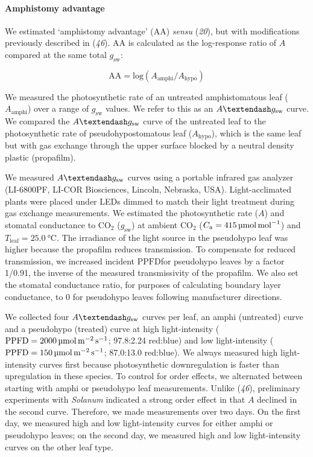 \documentclass[
  letterpaper,
  DIV=11,
  numbers=noendperiod]{scrartcl}
\let\oldparagraph\paragraph
\renewcommand{\paragraph}[1]{\oldparagraph{#1}\mbox{}}
\newcommand{\aax}{$\mathrm{AA}$}
\newcommand{\Aamphi}{$A_{\mathrm{amphi}}$}
\newcommand{\Ahypo}{$A_{\mathrm{hypo}}$}
\newcommand{\agcurve}{$A \textendash g_\text{sw}$}
\newcommand{\caequals}[1]{$C_\mathrm{a} = \qty{#1}{\micro\mol\raiseto{-1}\mol}$}
\newcommand{\gsw}{$g_\text{sw}$}
\newcommand{\ppfd}{$\mathrm{PPFD}$}
\newcommand{\ppfdequals}[1]{$\mathrm{PPFD} = \qty{#1}{\micro\mol\raiseto{-2}\meter\raiseto{-1}\second}$}
\newcommand{\tleafequals}[1]{$T_\mathrm{leaf} = \qty{#1}{\degreeCelsius}$}
\begin{document}
\paragraph{Amphistomy advantage}\label{amphistomy-advantage}

We estimated `amphistomy advantage' (\aax) \emph{sensu} (\emph{20}), but
with modifications previously described in (\emph{46}). \aax{} is
calculated as the log-response ratio of \(A\) compared at the same total
\gsw:

\[\mathrm{AA} = \mathrm{log}(A_{\mathrm{amphi}} / A_{\mathrm{hypo}})\]

We measured the photosynthetic rate of an untreated amphistomatous leaf
(\Aamphi) over a range of \gsw{} values. We refer to this as an
\agcurve{} curve. We compared the \agcurve{} curve of the untreated leaf
to the photosynthetic rate of pseudohypostomatous leaf (\Ahypo), which
is the same leaf but with gas exchange through the upper surface blocked
by a neutral density plastic (propafilm).

We measured \agcurve{} curves using a portable infrared gas analyzer
(LI-6800PF, LI-COR Biosciences, Lincoln, Nebraska, USA).
Light-acclimated plants were placed under LEDs dimmed to match their
light treatment during gas exchange measurements. We estimated the
photosynthetic rate (\(A\)) and stomatal conductance to CO\(_2\) (\gsw)
at ambient CO\(_2\) (\caequals{415}) and \tleafequals{25.0}. The
irradiance of the light source in the pseudohypo leaf was higher because
the propafilm reduces transmission. To compensate for reduced
transmission, we increased incident \ppfd for pseudohypo leaves by a
factor 1/0.91, the inverse of the measured transmissivity of the
propafilm. We also set the stomatal conductance ratio, for purposes of
calculating boundary layer conductance, to 0 for pseudohypo leaves
following manufacturer directions.

We collected four \agcurve{} curves per leaf, an amphi (untreated) curve
and a pseudohypo (treated) curve at high light-intensity
(\ppfdequals{2000}; 97.8:2.24 red:blue) and low light-intensity
(\ppfdequals{150}; 87.0:13.0 red:blue). We always measured high
light-intensity curves first because photosynthetic downregulation is
faster than upregulation in these species. To control for order effects,
we alternated between starting with amphi or pseudohypo leaf
measurements. Unlike (\emph{46}), preliminary experiments with
\emph{Solanum} indicated a strong order effect in that \(A\) declined in
the second curve. Therefore, we made measurements over two days. On the
first day, we measured high and low light-intensity curves for either
amphi or pseudohypo leaves; on the second day, we measured high and low
light-intensity curves on the other leaf type.
\end{document}
